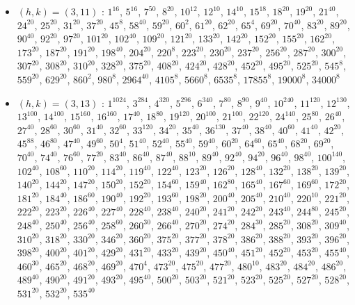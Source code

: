 \begin{itemize}
\item $(h,k)=(3,11)$ : $1^{16}$, $5^{16}$, $7^{50}$, $8^{20}$, $10^{12}$, $12^{10}$, $14^{10}$, $15^{18}$, $18^{20}$, $19^{20}$, $21^{40}$, $24^{20}$, $25^{20}$, $31^{20}$, $37^{20}$, $45^{8}$, $58^{40}$, $59^{20}$, $60^{2}$, $61^{20}$, $62^{20}$, $65^{4}$, $69^{20}$, $70^{40}$, $83^{20}$, $89^{20}$, $90^{40}$, $92^{20}$, $97^{20}$, $101^{20}$, $102^{40}$, $109^{20}$, $121^{20}$, $133^{20}$, $142^{20}$, $152^{20}$, $155^{20}$, $162^{20}$, $173^{20}$, $187^{20}$, $191^{20}$, $198^{40}$, $204^{20}$, $220^{8}$, $223^{20}$, $230^{20}$, $237^{20}$, $256^{20}$, $287^{20}$, $300^{20}$, $307^{20}$, $308^{20}$, $310^{20}$, $328^{20}$, $375^{20}$, $408^{20}$, $424^{20}$, $428^{20}$, $452^{20}$, $495^{20}$, $525^{20}$, $545^{8}$, $559^{20}$, $629^{20}$, $860^{2}$, $980^{8}$, $2964^{40}$, $4105^{8}$, $5660^{8}$, $6535^{8}$, $17855^{8}$, $19000^{8}$, $34000^{8}$
\item $(h,k)=(3,13)$ : $1^{1024}$, $3^{284}$, $4^{320}$, $5^{296}$, $6^{340}$, $7^{80}$, $8^{90}$, $9^{40}$, $10^{240}$, $11^{120}$, $12^{130}$, $13^{100}$, $14^{100}$, $15^{160}$, $16^{160}$, $17^{40}$, $18^{80}$, $19^{120}$, $20^{100}$, $21^{100}$, $22^{120}$, $24^{140}$, $25^{80}$, $26^{40}$, $27^{40}$, $28^{60}$, $30^{60}$, $31^{40}$, $32^{60}$, $33^{120}$, $34^{20}$, $35^{40}$, $36^{130}$, $37^{40}$, $38^{40}$, $40^{60}$, $41^{40}$, $42^{20}$, $45^{88}$, $46^{80}$, $47^{40}$, $49^{60}$, $50^{4}$, $51^{40}$, $52^{40}$, $55^{40}$, $59^{40}$, $60^{20}$, $64^{60}$, $65^{40}$, $68^{20}$, $69^{20}$, $70^{40}$, $74^{40}$, $76^{60}$, $77^{20}$, $83^{40}$, $86^{40}$, $87^{40}$, $88^{10}$, $89^{40}$, $92^{40}$, $94^{20}$, $96^{40}$, $98^{40}$, $100^{140}$, $102^{40}$, $108^{60}$, $110^{20}$, $114^{20}$, $119^{40}$, $122^{40}$, $123^{20}$, $126^{20}$, $128^{40}$, $132^{20}$, $138^{20}$, $139^{20}$, $140^{20}$, $144^{20}$, $147^{20}$, $150^{20}$, $152^{20}$, $154^{60}$, $159^{40}$, $162^{80}$, $165^{40}$, $167^{60}$, $169^{60}$, $172^{20}$, $181^{20}$, $184^{40}$, $186^{60}$, $190^{40}$, $192^{20}$, $193^{60}$, $198^{20}$, $200^{40}$, $205^{40}$, $210^{40}$, $220^{10}$, $221^{20}$, $222^{20}$, $223^{20}$, $226^{40}$, $227^{40}$, $228^{40}$, $238^{40}$, $240^{20}$, $241^{20}$, $242^{20}$, $243^{40}$, $244^{80}$, $245^{20}$, $248^{40}$, $250^{40}$, $256^{40}$, $258^{60}$, $260^{30}$, $266^{40}$, $270^{20}$, $274^{20}$, $284^{30}$, $285^{20}$, $308^{20}$, $309^{40}$, $310^{20}$, $318^{20}$, $330^{20}$, $346^{20}$, $360^{20}$, $375^{20}$, $377^{20}$, $378^{20}$, $386^{20}$, $388^{20}$, $393^{20}$, $396^{20}$, $398^{20}$, $400^{20}$, $401^{20}$, $429^{20}$, $431^{20}$, $433^{20}$, $439^{20}$, $450^{40}$, $451^{20}$, $452^{20}$, $453^{20}$, $455^{40}$, $460^{30}$, $465^{20}$, $468^{20}$, $469^{20}$, $470^{4}$, $473^{20}$, $475^{20}$, $477^{20}$, $480^{10}$, $483^{20}$, $484^{20}$, $486^{20}$, $489^{40}$, $490^{20}$, $491^{20}$, $493^{20}$, $495^{40}$, $500^{20}$, $503^{20}$, $521^{20}$, $523^{20}$, $525^{20}$, $527^{20}$, $528^{20}$, $531^{20}$, $532^{20}$, $535^{40}$

\end{itemize}
